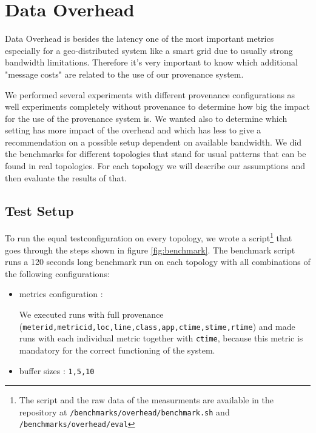 \section{Data Overhead}
Data Overhead is besides the latency one of the most important metrics especially for a geo-distributed system like a smart grid due to usually strong bandwidth limitations. Therefore it's very important to know which additional "message costs" are related to the use of our provenance system.

We performed several experiments with different provenance configurations as well experiments completely without provenance to determine how big the impact for the use of the provenance system is. We wanted also to determine which setting has more impact of the overhead and which has less to give a recommendation on a possible setup dependent on available bandwidth.
We did the benchmarks for different topologies that stand for usual patterns that can be found in real topologies. For each topology we will describe our assumptions and then evaluate the results of that.

\subsection{Test Setup}
To run the equal testconfiguration on every topology, we wrote a script\footnote{The script and the raw data of the measurments are available in the repository at \texttt{/benchmarks/overhead/benchmark.sh} and \texttt{/benchmarks/overhead/eval}} that goes through the steps shown in figure \ref{fig:benchmark}.
The benchmark script runs a 120 seconds long benchmark run on each topology with all combinations of the following configurations:


\begin{itemize}
\item metrics configuration :

We executed runs with full provenance (\texttt{meterid,metricid,loc,line,class,app,ctime,stime,rtime}) and made runs with each individual metric together with \texttt{ctime}, because this metric is mandatory for the correct functioning of the system.

\item buffer sizes : \texttt{1,5,10}
\end{itemize}



